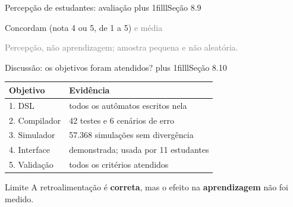 \documentclass[aspectratio=169,12pt]{beamer}
\newcommand{\notexto}[1]{\hskip 0pt plus 1filll{\normalfont\small\color{white!85!acento}#1}}
\begin{document}
\begin{frame}{Percepção de estudantes: avaliação\notexto{Seção 8.9}}
  \begin{center}
    Concordam (nota 4 ou 5, de 1 a 5) \textcolor{gray}{e média}\\[8pt]
  \end{center}
  \vspace{2pt}
  \centering\textcolor{gray}{Percepção, não aprendizagem; amostra pequena e não aleatória.}
\end{frame}

\begin{frame}{Discussão: os objetivos foram atendidos?\notexto{Seção 8.10}}
  \begin{center}
    \begin{tabular}{@{}ll@{}}
      \toprule
      \textbf{Objetivo} & \textbf{Evidência} \\
      \midrule
      1. DSL        & todos os autômatos escritos nela \\
      2. Compilador & 42 testes e 6 cenários de erro \\
      3. Simulador  & 57.368 simulações sem divergência \\
      4. Interface  & demonstrada; usada por 11 estudantes \\
      5. Validação  & todos os critérios atendidos \\
      \bottomrule
    \end{tabular}
  \end{center}
  \vspace{4pt}
  \begin{block}{Limite}
    A retroalimentação é \textbf{correta}, mas o efeito na \textbf{aprendizagem} não foi medido.
  \end{block}
\end{frame}
\end{document}
